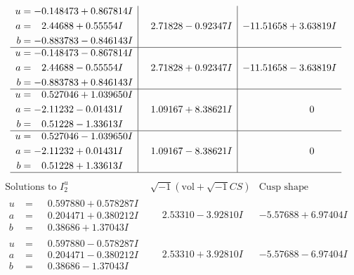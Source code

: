 \documentclass[1p]{elsarticle_modified}
\theoremstyle{definition}
\newcommand{\I}{\sqrt{-1}}
\begin{document}
$$\begin{array}{c|c|c}
\begin{aligned}
u &= -0.148473 + 0.867814 I \\
a &= \phantom{-}2.44688 + 0.55554 I \\
b &= -0.883783 - 0.846143 I\end{aligned}
 & \phantom{-}2.71828 - 0.92347 I & -11.51658 + 3.63819 I \\ \hline\begin{aligned}
u &= -0.148473 - 0.867814 I \\
a &= \phantom{-}2.44688 - 0.55554 I \\
b &= -0.883783 + 0.846143 I\end{aligned}
 & \phantom{-}2.71828 + 0.92347 I & -11.51658 - 3.63819 I \\ \hline\begin{aligned}
u &= \phantom{-}0.527046 + 1.039650 I \\
a &= -2.11232 - 0.01431 I \\
b &= \phantom{-}0.51228 - 1.33613 I\end{aligned}
 & \phantom{-}1.09167 + 8.38621 I & \phantom{-0.000000 } 0 \\ \hline\begin{aligned}
u &= \phantom{-}0.527046 - 1.039650 I \\
a &= -2.11232 + 0.01431 I \\
b &= \phantom{-}0.51228 + 1.33613 I\end{aligned}
 & \phantom{-}1.09167 - 8.38621 I & \phantom{-0.000000 } 0\\
 \hline 
 \end{array}$$\newpage$$\begin{array}{c|c|c}  
\text{Solutions to }I^u_{2}& \I (\text{vol} + \sqrt{-1}CS) & \text{Cusp shape}\\
 \hline 
\begin{aligned}
u &= \phantom{-}0.597880 + 0.578287 I \\
a &= \phantom{-}0.204471 + 0.380212 I \\
b &= \phantom{-}0.38686 + 1.37043 I\end{aligned}
 & \phantom{-}2.53310 - 3.92810 I & -5.57688 + 6.97404 I \\ \hline\begin{aligned}
u &= \phantom{-}0.597880 - 0.578287 I \\
a &= \phantom{-}0.204471 - 0.380212 I \\
b &= \phantom{-}0.38686 - 1.37043 I\end{aligned}
 & \phantom{-}2.53310 + 3.92810 I & -5.57688 - 6.97404 I \\ \hline\begin{aligned}

\end{aligned}
\end{array}$$
\end{document}
